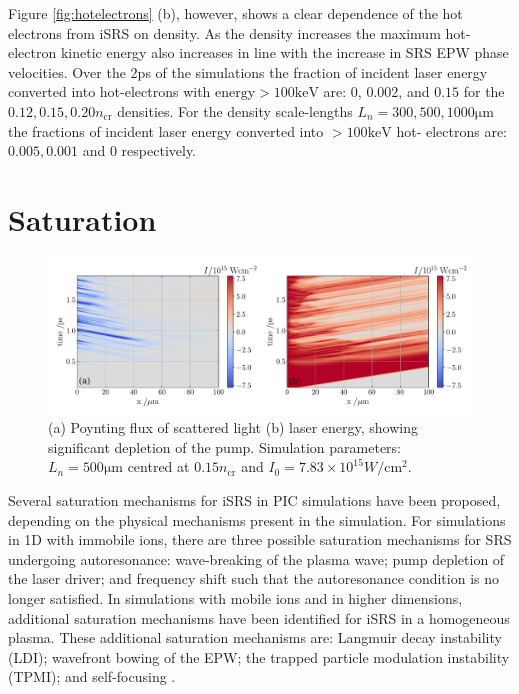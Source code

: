 Figure \ref{fig:hotelectrons} (b), however, shows a clear dependence of the hot
electrons from iSRS on density. As the density increases the maximum hot-
electron kinetic energy also increases in line with the increase in SRS EPW
phase velocities.
Over the 2ps of the simulations the fraction of incident laser energy converted
into hot-electrons with $\mathrm{energy} > 100\si{\kilo \electronvolt}$ are: 0,
$0.002$, and $0.15$ for the $0.12,0.15,0.20 n_\mathrm{cr}$ densities. For the
density scale-lengths $L_n=300,500,1000\si{\micro\metre}$ the fractions of
incident laser energy converted into $> 100\si{\kilo \electronvolt}$ hot-
electrons are: $0.005,0.001$ and $0$ respectively.





\section{Saturation}

\begin{figure}[ht]
   \centering
    \includegraphics[width=\columnwidth]{Chapters/C4_iSRS/783e15_pump_depletion.pdf}
    \caption{(a) Poynting flux of scattered light (b) laser energy, showing significant depletion of the pump. Simulation parameters: $L_n = 500 \si{\micro\metre} $ centred at $0.15n_\mathrm{cr}$
    and $I_0 = 7.83\times10^{15} \si{W/\centi\metre^2}$. }
    \label{fig:pumpdepletion}
\end{figure}{}


Several saturation mechanisms for iSRS in PIC simulations have been proposed, depending on the physical mechanisms present in the simulation. For simulations in 1D with immobile ions, there are three possible saturation mechanisms for SRS undergoing autoresonance: wave-breaking of the plasma wave; pump depletion of the laser driver; and frequency shift such that the autoresonance condition is no longer satisfied. In simulations with mobile ions and in higher dimensions, additional saturation mechanisms have been identified for iSRS in a homogeneous plasma. These additional saturation mechanisms are: Langmuir decay instability (\acrshort{LDI}); wavefront bowing of the EPW; the trapped particle modulation instability (\acrshort{TPMI}); and self-focusing \citep{Yin2007}.

